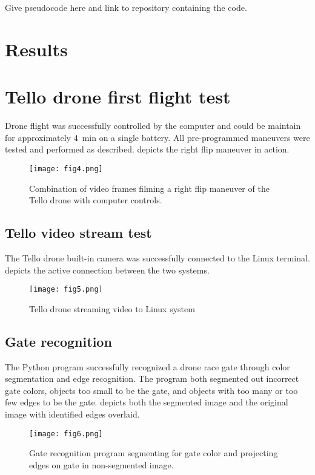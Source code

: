\documentclass[onecolumn,10pt]{IEEEtran}
\begin{document}
Give pseudocode here and link to repository containing the code. 





   

\section{Results}

\section{Tello drone first flight test}
Drone flight was successfully controlled by the computer and could be maintain for approximately \SI{4}{\minute} on a single battery. All pre-programmed maneuvers were tested and performed as described.  depicts the right flip maneuver in action.
\begin{figure}[ht]
\begin{center}
\texttt{[image: fig4.png]}
\end{center}
\caption{Combination of video frames filming a right flip maneuver of the Tello drone with computer controls.}
\label{fig:4}
\end{figure}

\subsection{Tello video stream test}
The Tello drone built-in camera was successfully connected to the Linux terminal.  depicts the active connection between the two systems. 
\begin{figure}[h]
\begin{center}
\texttt{[image: fig5.png]}
\end{center}
\caption{Tello drone streaming video to Linux system}
\label{fig:5}
\end{figure}

\subsection{Gate recognition}
The Python program successfully recognized a drone race gate through color segmentation and edge recognition. The program both segmented out incorrect gate colors, objects too small to be the gate, and objects with too many or too few edges to be the gate.  depicts both the segmented image and the original image with identified edges overlaid.
\begin{figure}[t]
\begin{center}
\texttt{[image: fig6.png]}
\end{center}
\caption{Gate recognition program segmenting for gate color and projecting edges on gate in non-segmented image.}
\label{fig:6}
\end{figure}
\end{document}
